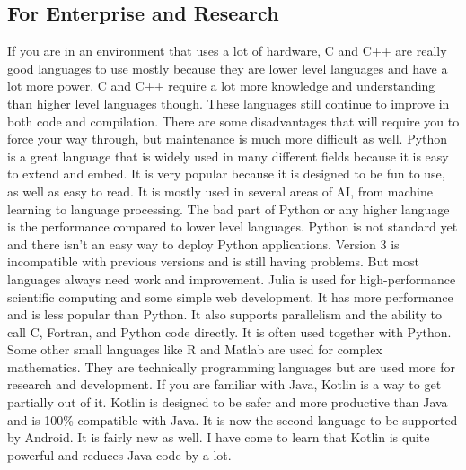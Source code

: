 \documentclass[letterpaper, 10 pt, conference]{IEEEtran}
\begin{document}
\subsection{For Enterprise and Research}
\indent If you are in an environment that uses a lot of hardware, C and C++ are really good languages to use mostly because they are lower level languages and have a lot more power. C and C++ require a lot more knowledge and understanding than higher level languages though. These languages still continue to improve in both code and compilation. There are some disadvantages that will require you to force your way through, but maintenance is much more difficult as well. Python is a great language that is widely used in many different fields because it is easy to extend and embed. It is very popular because it is designed to be fun to use, as well as easy to read. It is mostly used in several areas of AI, from machine learning to language processing. The bad part of Python or any higher language is the performance compared to lower level languages. Python is not standard yet and there isn't an easy way to deploy Python applications. Version 3 is incompatible with previous versions and is still having problems. But most languages always need work and improvement.  Julia is used for high-performance scientific computing and some simple web development. It has more performance and is less popular than Python. It also supports parallelism and the ability to call C, Fortran, and Python code directly. It is often used together with Python. Some other small languages like R and Matlab are used for complex mathematics. They are technically programming languages but are used more for research and development. If you are familiar with Java, Kotlin is a way to get partially out of it. Kotlin is designed to be safer and more productive than Java and is 100\% compatible with Java. It is now the second language to be supported by Android. It is fairly new as well. I have come to learn that Kotlin is quite powerful and reduces Java code by a lot.
\newline
\end{document}
